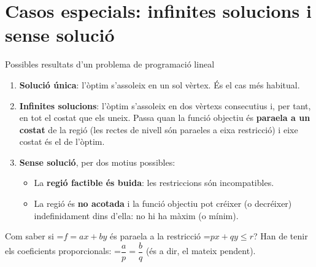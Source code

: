 \documentclass[11pt,a4paper]{article}
\newcommand{\fmm}[1]{\setbox0=\hbox{$#1$}\ifdim\wd0>\linewidth\fmdisp{#1}\else\mbox{\box0}\fi}
\newcommand{\fmdisp}[1]{\[\setbox2=\hbox{$\displaystyle #1$}\ifdim\wd2>\linewidth\resizebox{\linewidth}{!}{\box2}\else\box2\fi\]}
\newcommand{\fmbadge}[2]{\tcbox[on line,colback=#1,colframe=#1,arc=2mm,boxsep=0pt,left=4pt,right=4pt,top=1.5pt,bottom=1.5pt]{\color{white}\footnotesize\bfseries #2}}
\begin{document}
\section{Casos especials: infinites solucions i sense solució}\hypertarget{sec5}{}

\begin{fmprop}{Possibles resultats d'un problema de programació lineal}
\begin{enumerate}
\item \fmbadge{fmok}{1} \textbf{Solució única}: l'òptim s'assoleix en un sol vèrtex. És el cas més habitual.
\item \fmbadge{fmev}{$\infty$} \textbf{Infinites solucions}: l'òptim s'assoleix en dos vèrtexs consecutius i, per tant, en tot el costat que els uneix. Passa quan la funció objectiu és \textbf{para\lgem{}ela a un costat} de la regió (les rectes de nivell són para\lgem{}eles a eixa restricció) i eixe costat és el de l'òptim.
\item \fmbadge{fmas}{$\emptyset$} \textbf{Sense solució}, per dos motius possibles:

\begin{itemize}
\item La \textbf{regió factible és buida}: les restriccions són incompatibles.
\item La regió és \textbf{no acotada} i la funció objectiu pot créixer (o decréixer) indefinidament dins d'ella: no hi ha màxim (o mínim).
\end{itemize}
\end{enumerate}

\begin{fmnote}Com saber si \fmm{f=ax+by} és para\lgem{}ela a la restricció \fmm{px+qy\leq r}? Han de tenir els coeficients proporcionals: \fmm{\dfrac{a}{p}=\dfrac{b}{q}} (és a dir, el mateix pendent).\end{fmnote}
\end{fmprop}
\end{document}
